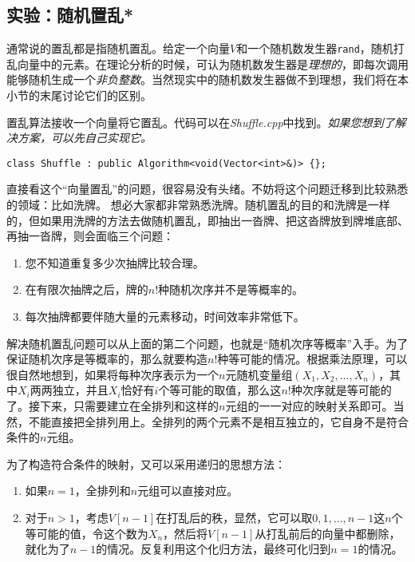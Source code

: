 \subsection{实验：随机置乱*}
通常说的置乱都是指随机置乱。给定一个向量$V$和一个随机数发生器\lstinline{rand}，随机打乱向量中的元素。在理论分析的时候，可认为随机数发生器是\textit{理想的}，即每次调用能够随机生成一个\textit{非负整数}。当然现实中的随机数发生器做不到理想，我们将在本小节的末尾讨论它们的区别。

置乱算法接收一个向量将它置乱。代码可以在\textit{Shuffle.cpp}中找到。\textit{如果您想到了解决方案，可以先自己实现它。}

\begin{lstlisting}
class Shuffle : public Algorithm<void(Vector<int>&)> {};
\end{lstlisting}

直接看这个“向量置乱”的问题，很容易没有头绪。不妨将这个问题迁移到比较熟悉的领域：比如洗牌。
想必大家都非常熟悉洗牌。随机置乱的目的和洗牌是一样的，但如果用洗牌的方法去做随机置乱，即抽出一沓牌、把这沓牌放到牌堆底部、再抽一沓牌，则会面临三个问题：
\begin{enumerate}
    \item 您不知道重复多少次抽牌比较合理。
    \item 在有限次抽牌之后，牌的$n!$种随机次序并不是等概率的。
    \item 每次抽牌都要伴随大量的元素移动，时间效率非常低下。
\end{enumerate}

解决随机置乱问题可以从上面的第二个问题，也就是“随机次序等概率”入手。为了保证随机次序是等概率的，那么就要构造$n!$种等可能的情况。根据乘法原理，可以很自然地想到，如果将每种次序表示为一个$n$元随机变量组$(X_1, X_2, ..., X_n)$，其中$X_i$两两独立，并且$X_i$恰好有$i$个等可能的取值，那么这$n!$种次序就是等可能的了。接下来，只需要建立在全排列和这样的$n$元组的一一对应的映射关系即可。当然，不能直接把全排列用上。全排列的两个元素不是相互独立的，它自身不是符合条件的$n$元组。

为了构造符合条件的映射，又可以采用递归的思想方法：

\begin{enumerate}
    \item 如果$n = 1$，全排列和$n$元组可以直接对应。
    \item 对于$n > 1$，考虑$V[n-1]$在打乱后的秩，显然，它可以取$0,1,\dots,n-1$这$n$个等可能的值，令这个数为$X_n$，然后将$V[n-1]$从打乱前后的向量中都删除，就化为了$n-1$的情况。反复利用这个化归方法，最终可化归到$n = 1$的情况。
\end{enumerate}

